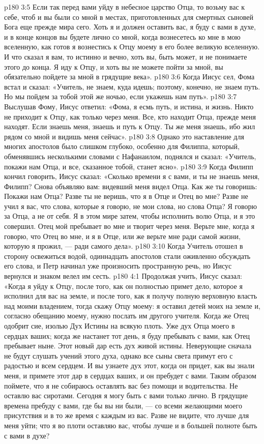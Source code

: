 \vs p180 3:5 Если так перед вами уйду в небесное царство Отца, то возьму вас к себе, чтоб и вы были со мной в местах, приготовленных для смертных сыновей Бога еще прежде мира сего. Хоть я и должен оставить вас, я буду с вами в духе, и в конце концов вы будете лично со мной, когда вознесетесь ко мне в мою вселенную, как готов я вознестись к Отцу моему в его более великую вселенную. И что сказал я вам, то истинно и вечно, хоть вы, быть может, и не понимаете этого до конца. Я иду к Отцу, и хоть вы не можете пойти за мной, вы обязательно пойдете за мной в грядущие века».
\vs p180 3:6 Когда Иисус сел, Фома встал и сказал: «Учитель, не знаем, куда идешь; поэтому, конечно, не знаем путь. Но мы пойдем за тобой этой же ночью, если укажешь нам путь».
\vs p180 3:7 Выслушав Фому, Иисус ответил: «Фома, я есмь путь, и истина, и жизнь. Никто не приходит к Отцу, как только через меня. Все, кто находит Отца, прежде меня находят. Если знаешь меня, знаешь и путь к Отцу. Ты же меня знаешь, ибо жил рядом со мной и видишь меня сейчас».
\vs p180 3:8 Однако это наставление для многих апостолов было слишком глубоко, особенно для Филиппа, который, обменявшись несколькими словами с Нафанаилом, поднялся и сказал: «Учитель, покажи нам Отца, и все, сказанное тобой, станет ясно».
\vs p180 3:9 Когда Филипп кончил говорить, Иисус сказал: «Сколько времени я с вами, и ты не знаешь меня, Филипп? Снова объявляю вам: видевший меня видел Отца. Как же ты говоришь: Покажи нам Отца? Разве ты не веришь, что я в Отце и Отец во мне? Разве не учил я вас, что слова, которые я говорю, не мои слова, но слова Отца? Я говорю за Отца, а не от себя. Я в этом мире затем, чтобы исполнить волю Отца, и я это совершил. Отец мой пребывает во мне и творит через меня. Верьте мне, когда я говорю, что Отец во мне, и я в Отце, или же верьте мне ради самой жизни, которую я прожил, --- ради самого дела».
\vs p180 3:10 Когда Учитель отошел в сторону освежиться водой, одиннадцать апостолов стали оживленно обсуждать его слова, и Петр начинал уже произносить пространную речь, но Иисус вернулся и знаком велел им сесть.
\vs p180 4:1 Продолжая учить, Иисус сказал: «Когда я уйду к Отцу, после того, как он полностью примет дело, которое я исполнил для вас на земле, и после того, как я получу полную верховную власть над моими владением, тогда скажу Отцу моему: я оставил детей моих на земле и, согласно обещанию моему, нужно послать им другого учителя. Когда же Отец одобрит сие, изолью Дух Истины на всякую плоть. Уже дух Отца моего в сердцах ваших; когда же настанет тот день, я буду пребывать с вами, как Отец пребывает ныне. Этот новый дар есть дух живой истины. Неверующие сначала не будут слушать учений этого духа, однако все сыны света примут его с радостью и всем сердцем. И вы узнаете дух этот, когда он придет, как вы знали меня, и примете этот дар в сердцах ваших, и он пребудет с вами. Таким образом поймете, что я не собираюсь оставлять вас без помощи и водительства. Не оставлю вас сиротами. Сегодня я могу быть с вами только лично. В грядущие времена пребуду с вами, где бы вы ни были, --- со всеми желающими моего присутствия и в то же время с каждым из вас. Разве не видите, что лучше для меня уйти; что я во плоти оставляю вас, чтобы лучше и в большей полноте быть с вами в духе?
